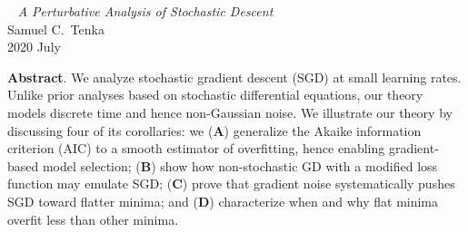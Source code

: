 \documentclass[openany, notitlepage, justified]{tufte-book}
\theoremstyle{plain}
\theoremstyle{definition}
\begin{document}
    \begin{center}\
        \Huge
        \emph{A Perturbative Analysis of Stochastic Descent}\\
        \vspace{0.5cm}
        \LARGE
        Samuel C.~Tenka \\
        \vspace{0.5cm}
        2020 July
    \end{center}
    
    
    \vspace{1cm}
    \textbf{Abstract}.
        We analyze stochastic gradient descent (SGD) at small learning rates.
        Unlike prior analyses based on stochastic differential equations, our
        theory models discrete time and hence non-Gaussian noise.
        We illustrate our theory by discussing four of its corollaries: we
        (\textbf{A}) generalize the Akaike information criterion (AIC) to a
        smooth estimator of overfitting, hence enabling gradient-based model
        selection;
        (\textbf{B}) show how non-stochastic GD with a modified loss
        function may emulate SGD;
        (\textbf{C}) prove that gradient noise systematically pushes SGD
        toward flatter minima; and
        (\textbf{D}) characterize when and why flat minima overfit less than
        other minima.

 
\end{document}
